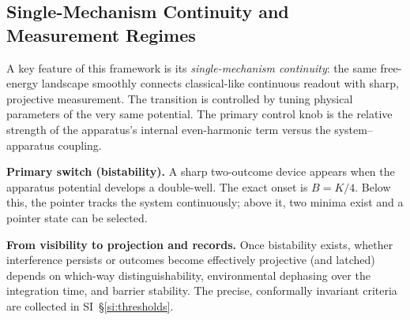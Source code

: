 \documentclass[11pt]{article}
\begin{document}
\subsection{Single-Mechanism Continuity and Measurement Regimes}
A key feature of this framework is its \emph{single-mechanism continuity}: the same free-energy landscape smoothly connects classical-like continuous readout with sharp, projective measurement. The transition is controlled by tuning physical parameters of the very same potential. The primary control knob is the relative strength of the apparatus's internal even-harmonic term versus the system–apparatus coupling.

\noindent \textbf{Primary switch (bistability).} A sharp two-outcome device appears when the apparatus potential develops a double-well. The exact onset is $B=K/4$. Below this, the pointer tracks the system continuously; above it, two minima exist and a pointer state can be selected.

\noindent \textbf{From visibility to projection and records.} Once bistability exists, whether interference persists or outcomes become effectively projective (and latched) depends on which-way distinguishability, environmental dephasing over the integration time, and barrier stability. The precise, conformally invariant criteria are collected in SI~\S\ref{si:thresholds}.
\end{document}
